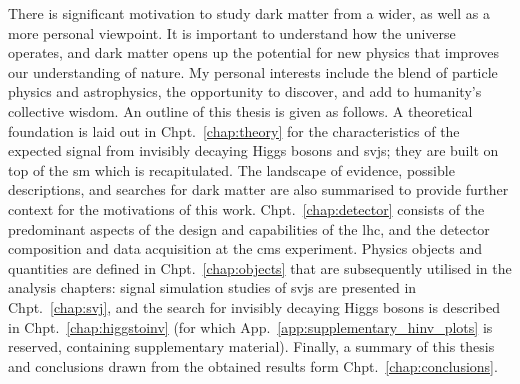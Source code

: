 There is significant motivation to study dark matter from a wider, as well as a more personal viewpoint. It is important to understand how the universe operates, and dark matter opens up the potential for new physics that improves our understanding of nature. My personal interests include the blend of particle physics and astrophysics, the opportunity to discover, and add to humanity's collective wisdom. An outline of this thesis is given as follows. A theoretical foundation is laid out in Chpt.~\ref{chap:theory} for the characteristics of the expected signal from invisibly decaying Higgs bosons and \glspl{svj}; they are built on top of the \acrlong{sm} which is recapitulated. The landscape of evidence, possible descriptions, and searches for dark matter are also summarised to provide further context for the motivations of this work. Chpt.~\ref{chap:detector} consists of the predominant aspects of the design and capabilities of the \acrlong{lhc}, and the detector composition and data acquisition at the \acrshort{cms} experiment. Physics objects and quantities are defined in Chpt.~\ref{chap:objects} that are subsequently utilised in the analysis chapters: signal simulation studies of \glspl{svj} are presented in Chpt.~\ref{chap:svj}, and the search for invisibly decaying Higgs bosons is described in Chpt.~\ref{chap:higgstoinv} (for which App.~\ref{app:supplementary_hinv_plots} is reserved, containing supplementary material). Finally, a summary of this thesis and conclusions drawn from the obtained results form Chpt.~\ref{chap:conclusions}.
